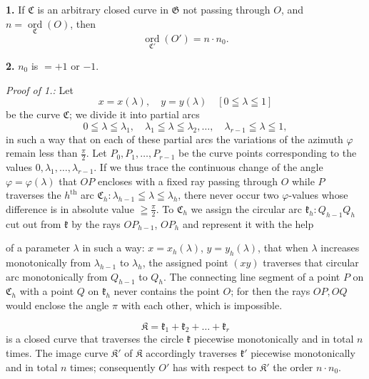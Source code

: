 \documentclass{article}
\begin{document}
\textbf{1.} If $\mathfrak{C}$ is an arbitrary closed curve in $\mathfrak{G}$ not passing through $O$, and $n = \underset{\mathfrak{C}}{\operatorname{ord}}(O)$, then
\[ \underset{\mathfrak{C}'}{\operatorname{ord}}(O') = n \cdot n_0. \]

\textbf{2.} $n_0$ is $= +1$ or $-1$.

\emph{Proof of 1.:} Let
\[ x = x(\lambda), \quad y = y(\lambda) \quad [0 \leqq \lambda \leqq 1] \]
be the curve $\mathfrak{C}$; we divide it into partial arcs
\[ 0 \leqq \lambda \leqq \lambda_1, \quad \lambda_1 \leqq \lambda \leqq \lambda_2, \dots, \quad \lambda_{r-1} \leqq \lambda \leqq 1, \]
in such a way that on each of these partial arcs the variations of the azimuth $\varphi$ remain less than $\frac{\pi}{2}$. Let $P_0, P_1, \dots, P_{r-1}$ be the curve points corresponding to the values $0, \lambda_1, \dots, \lambda_{r-1}$. If we thus trace the continuous change of the angle $\varphi = \varphi(\lambda)$ that $OP$ encloses with a fixed ray passing through $O$ while $P$ traverses the $h^{\text{th}}$ arc $\mathfrak{C}_h\colon \lambda_{h-1} \leqq \lambda \leqq \lambda_h$, there never occur two $\varphi$-values whose difference is in absolute value $\geqq \frac{\pi}{2}$. To $\mathfrak{C}_h$ we assign the circular arc $\mathfrak{k}_h\colon Q_{h-1} Q_h$ cut out from $\mathfrak{k}$ by the rays $OP_{h-1}$, $OP_h$ and represent it with the help

of a parameter $\lambda$ in such a way: $x = x_h(\lambda)$, $y = y_h(\lambda)$, that when $\lambda$ increases monotonically from $\lambda_{h-1}$ to $\lambda_h$, the assigned point $(xy)$ traverses that circular arc monotonically from $Q_{h-1}$ to $Q_h$. The connecting line segment of a point $P$ on $\mathfrak{C}_h$ with a point $Q$ on $\mathfrak{k}_h$ never contains the point $O$; for then the rays $OP, OQ$ would enclose the angle $\pi$ with each other, which is impossible.


\[ \mathfrak{K} = \mathfrak{k}_1 + \mathfrak{k}_2 + \dots + \mathfrak{k}_r \]
is a closed curve that traverses the circle $\mathfrak{k}$ piecewise monotonically and in total $n$ times. The image curve $\mathfrak{K}'$ of $\mathfrak{K}$ accordingly traverses $\mathfrak{k}'$ piecewise monotonically and in total $n$ times; consequently $O'$ has with respect to $\mathfrak{K}'$ the order $n \cdot n_0$.
\end{document}
